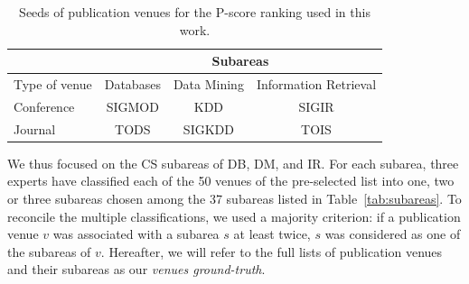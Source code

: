 \documentclass[msc]{ppgccufmg}
\begin{document}
\begin{table}[htbp]
\centering
\caption{Seeds of publication venues for the P-score ranking used in this work.}
\label{tab:seeds}
\begin{tabular}{l|ccc}
\toprule
                                   & \multicolumn{3}{c}{Subareas}                                                            \\ \hline
\multicolumn{1}{c|}{Type of venue} & \multicolumn{1}{c|}{Databases} & \multicolumn{1}{c|}{Data Mining} & Information Retrieval \\ \hline
\multicolumn{1}{l|}{Conference}    & \multicolumn{1}{c|}{SIGMOD}   & \multicolumn{1}{c|}{KDD}         & SIGIR                 \\ \hline
\multicolumn{1}{l|}{Journal}       & \multicolumn{1}{c|}{TODS}     & \multicolumn{1}{c|}{SIGKDD}      & TOIS                 \\
\bottomrule
\end{tabular}
\end{table}

We thus focused on the CS subareas of DB, DM, and IR. For each subarea, three experts have classified each of the 50 venues of the pre-selected list into one, two or three subareas chosen among the 37 subareas listed in Table~\ref{tab:subareas}. To reconcile the multiple classifications, we used a majority criterion: if a publication venue $v$ was associated with a subarea $s$ at least twice, $s$ was considered as one of the subareas of $v$. Hereafter, we will refer to the full lists of publication venues and their subareas as our \textit{venues ground-truth}.



%
%
%
\end{document}
